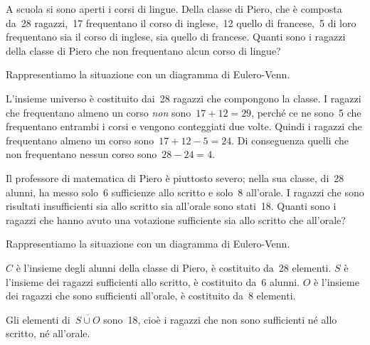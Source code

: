 {\begin{comment}
\end{comment}

\begin{esempio}
 A scuola si sono aperti i corsi di lingue. Della classe di Piero, che è 
 composta da~28 ragazzi,~17 frequentano il corso di inglese,~12
quello di francese,~5 di loro frequentano sia il corso di inglese, sia 
quello di francese. Quanti sono i ragazzi della classe di Piero che non
frequentano alcun corso di lingue?

Rappresentiamo la situazione con un diagramma di Eulero-Venn.

\begin{minipage}{.59 \textwidth}
L'insieme universo è costituito dai~28 ragazzi che
compongono la classe. I ragazzi che frequentano almeno un corso \emph{non} 
sono~\(17+12=29\), perché ce ne sono~5 che frequentano entrambi i corsi e
vengono conteggiati due volte. Quindi i ragazzi che frequentano almeno un 
corso sono~\(17+12-5=24\). Di conseguenza quelli che non frequentano
nessun corso sono~\(28-24=4\).
\end{minipage}
\hfill
\begin{minipage}{.39 \textwidth}
\begin{center}
 
 \end{center}
\end{minipage}
\end{esempio}

\begin{esempio}
 Il professore di matematica di Piero è piuttosto severo; nella sua classe, 
 di~28 alunni, ha messo solo~6 sufficienze allo scritto e solo~8 all'orale. 
 I ragazzi che sono risultati insufficienti sia allo scritto sia 
all'orale sono stati~18. 
Quanti sono i ragazzi che hanno avuto una votazione sufficiente sia allo 
scritto che all'orale?

Rappresentiamo la situazione con un diagramma di Eulero-Venn.

\begin{minipage}{.59 \textwidth}
\(C\) è l'insieme degli alunni della classe di Piero, è costituito da~28 
elementi. \(S\) è l'insieme dei ragazzi sufficienti allo scritto, 
è costituito da~6 alunni. \(O\) è l'insieme dei ragazzi che sono sufficienti
all'orale, è costituito da~8 elementi.

Gli elementi di~\(\overline{{S\cup O}}\) sono~18, cioè i ragazzi che
non sono sufficienti né allo scritto, né all'orale.
\end{minipage}
\hfill
\begin{minipage}{.39 \textwidth}
\begin{center}
 
\end{center}
\end{minipage}


\end{esempio}}
